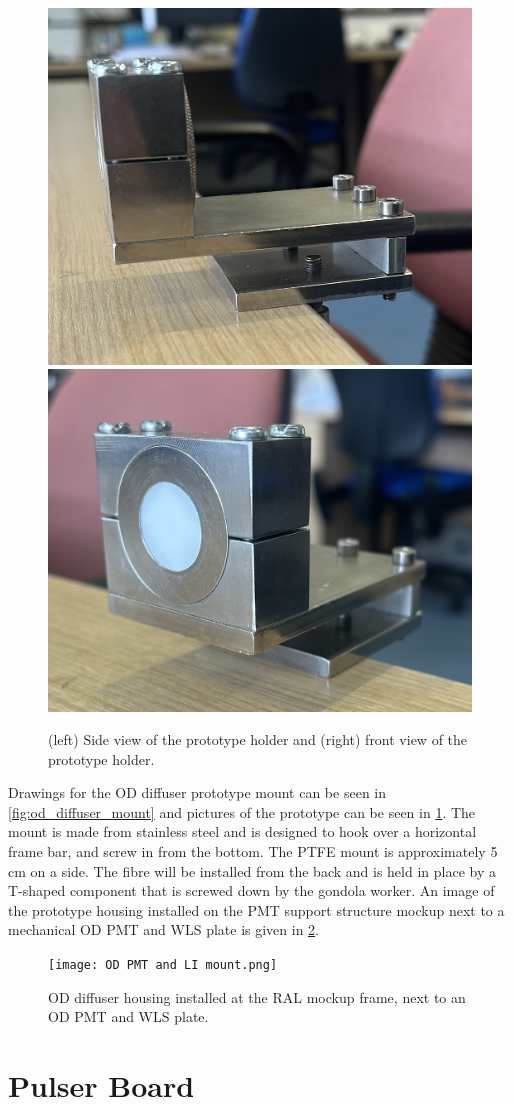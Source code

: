\documentclass[a4paper,11pt]{article}
\begin{document}
\begin{figure}
\centering 
\includegraphics[width=.45\textwidth]{OD_stand_tophat_side.jpg}%
\includegraphics[width=.45\textwidth]{OD_stand_tophat_front.jpg}
\caption{(left) Side view of the prototype holder and (right) front view of the prototype holder.}
\label{fig:od_diffuser_mount_pics}
\end{figure}

Drawings for the OD diffuser prototype mount can be seen in \cref{fig:od_diffuser_mount} and pictures of the prototype can be seen in \cref{fig:od_diffuser_mount_pics}. The mount is made from stainless steel and is designed to hook over a horizontal frame bar, and screw in from the bottom. The PTFE mount is approximately 5 cm on a side. The fibre will be installed from the back and is held in place by a T-shaped component that is screwed down by the gondola worker. An image of the prototype housing installed on the PMT support structure mockup next to a mechanical OD PMT and WLS plate is given in \cref{fig:ODPMTRAL}.

\begin{figure}
\centering
\texttt{[image: OD PMT and LI mount.png]}
\caption{OD diffuser housing installed at the RAL mockup frame, next to an OD PMT and WLS plate.}\label{fig:ODPMTRAL}
\end{figure}


\section{Pulser Board}\label{sec:LEDpulser}
\end{document}

